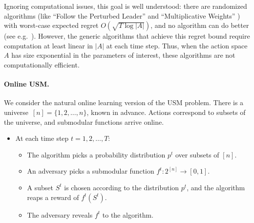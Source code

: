 \documentclass[final,12pt]{colt2018}
\begin{document}
Ignoring computational issues, this goal is well understood:
there are randomized algorithms (like ``Follow the Perturbed Leader''
\citep{KV05} and ``Multiplicative Weights'' \citep{CBMS07,FS97}) 
with worst-case expected regret $O(\sqrt{T \log
  |A|})$, and no algorithm can do better (see
e.g.~\cite{CL06}).  
However, the generic algorithms that achieve this regret bound require
computation at least linear in $|A|$ at each time step.  Thus, when the action
space $A$ has size exponential in the parameters of interest, these algorithms
are not computationally efficient.

\paragraph{Online USM.}
We consider the natural online learning version of the USM problem.
There is a universe~$[n]=\{1,2,\ldots,n\}$, known in advance.  
Actions correspond to subsets of the universe,
and submodular functions arrive online.
\begin{itemize}
\item At each time step $t=1,2,\ldots,T$:
\begin{itemize}
\item The algorithm picks a probability distribution $p^t$ over subsets of $[n]$.
\item An adversary picks a submodular function $f^t:2^{[n]} \rightarrow
  [0,1]$.
\item A subset $S^t$ is chosen according to the distribution $p^t$,
  and the algorithm reaps a reward of $f^t(S^t)$.
\item The adversary reveals $f^t$ to the algorithm.
\end{itemize}
\end{itemize}
\end{document}
